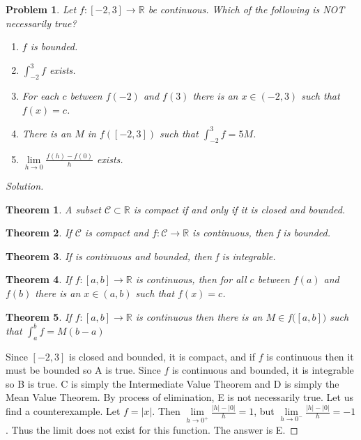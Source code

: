 \documentclass[12pt,oneside]{book}
\theoremstyle{mystyle}
\newtheorem{problem}{Problem}[section]
\newtheorem*{theorem*}{Theorem}
\begin{document}
\begin{problem}
Let $f:[-2,3]\rightarrow \mathbb{R}$ be continuous. Which of the following is NOT necessarily true?
\begin{enumerate}
    \item[A.)] $f$ is bounded.
    \item[B.)] $\int_{-2}^{3}f$ exists.
    \item[C.)] For each $c$ between $f(-2)$ and $f(3)$ there is an $x\in (-2,3)$ such that $f(x) = c$.
    \item[D.)] There is an $M$ in $f([-2,3])$ such that $\int_{-2}^{3}f = 5M$.
    \item $\underset{h\rightarrow 0}\lim \frac{f(h)-f(0)}{h}$ exists.
\end{enumerate}
\end{problem}
\begin{proof}[Solution]
\begin{theorem*}
A subset $\mathcal{C}\subset \mathbb{R}$ is compact if and only if it is closed and bounded.
\end{theorem*}
\begin{theorem*}
If $\mathcal{C}$ is compact and $f:\mathcal{C}\rightarrow \mathbb{R}$ is continuous, then f is bounded.
\end{theorem*}
\begin{theorem*}
If is continuous and bounded, then f is integrable.
\end{theorem*}
\begin{theorem*}
If $f:[a,b] \rightarrow \mathbb{R}$ is continuous, then for all $c$ between $f(a)$ and $f(b)$ there is an $x\in (a,b)$ such that $f(x) = c$.
\end{theorem*}
\begin{theorem*}
If $f:[a,b]\rightarrow \mathbb{R}$ is continuous then there is an $M\in f\big([a,b]\big)$ such that $\int_{a}^{b}f = M(b-a)$
\end{theorem*}
\noindent Since $[-2,3]$ is closed and bounded, it is compact, and if $f$ is continuous then it must be bounded so A is true. Since $f$ is continuous and bounded, it is integrable so B is true. C is simply the Intermediate Value Theorem and D is simply the Mean Value Theorem. By process of elimination, E is not necessarily true. Let us find a counterexample. Let $f = |x|$. Then $\underset{h\rightarrow 0^+}\lim \frac{|h|-|0|}{h} = 1$, but $\underset{h\rightarrow 0^{-}}\lim \frac{|h|-|0|}{h} = -1$. Thus the limit does not exist for this function. The answer is E.
\end{proof}
\end{document}

